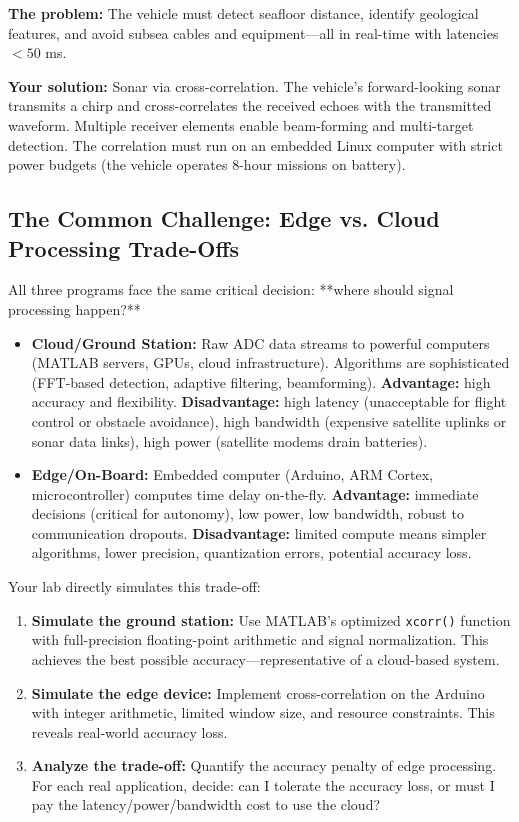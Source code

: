 \documentclass[11pt,letterpaper]{article}
\begin{document}
\textbf{The problem:} The vehicle must detect seafloor distance, identify geological features, and avoid subsea cables and equipment—all in real-time with latencies $< 50$ ms.

\textbf{Your solution:} Sonar via cross-correlation. The vehicle's forward-looking sonar transmits a chirp and cross-correlates the received echoes with the transmitted waveform. Multiple receiver elements enable beam-forming and multi-target detection. The correlation must run on an embedded Linux computer with strict power budgets (the vehicle operates 8-hour missions on battery).

\subsection{The Common Challenge: Edge vs. Cloud Processing Trade-Offs}

All three programs face the same critical decision: **where should signal processing happen?**

\begin{itemize}
    \item \textbf{Cloud/Ground Station:} Raw ADC data streams to powerful computers (MATLAB servers, GPUs, cloud infrastructure). Algorithms are sophisticated (FFT-based detection, adaptive filtering, beamforming). \textbf{Advantage:} high accuracy and flexibility. \textbf{Disadvantage:} high latency (unacceptable for flight control or obstacle avoidance), high bandwidth (expensive satellite uplinks or sonar data links), high power (satellite modems drain batteries).

    \item \textbf{Edge/On-Board:} Embedded computer (Arduino, ARM Cortex, microcontroller) computes time delay on-the-fly. \textbf{Advantage:} immediate decisions (critical for autonomy), low power, low bandwidth, robust to communication dropouts. \textbf{Disadvantage:} limited compute means simpler algorithms, lower precision, quantization errors, potential accuracy loss.
\end{itemize}

\noindent
Your lab directly simulates this trade-off:

\begin{enumerate}
    \item \textbf{Simulate the ground station:} Use MATLAB's optimized \texttt{xcorr()} function with full-precision floating-point arithmetic and signal normalization. This achieves the best possible accuracy—representative of a cloud-based system.
    \item \textbf{Simulate the edge device:} Implement cross-correlation on the Arduino with integer arithmetic, limited window size, and resource constraints. This reveals real-world accuracy loss.
    \item \textbf{Analyze the trade-off:} Quantify the accuracy penalty of edge processing. For each real application, decide: can I tolerate the accuracy loss, or must I pay the latency/power/bandwidth cost to use the cloud?
\end{enumerate}
\end{document}
